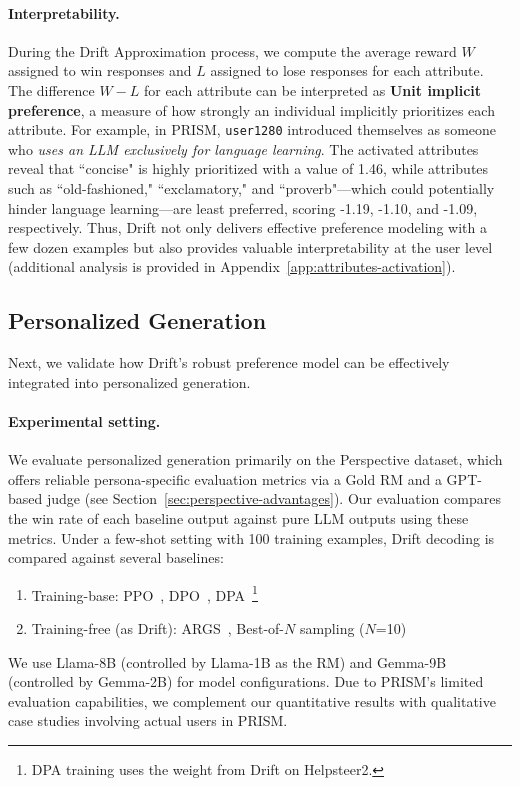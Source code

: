 \paragraph{Interpretability.}
During the Drift Approximation process, we compute the average reward $W$ assigned to win responses and $L$ assigned to lose responses for each attribute. The difference $W-L$ for each attribute can be interpreted as \textbf{Unit implicit preference}, a measure of how strongly an individual implicitly prioritizes each attribute. For example, in PRISM, \texttt{user1280} introduced themselves as someone who \textit{uses an LLM exclusively for language learning}. The activated attributes reveal that ``concise" is highly prioritized with a value of 1.46, while attributes such as ``old-fashioned," ``exclamatory," and ``proverb"—which could potentially hinder language learning—are least preferred, scoring -1.19, -1.10, and -1.09, respectively. Thus, Drift not only delivers effective preference modeling with a few dozen examples but also provides valuable interpretability at the user level (additional analysis is provided in Appendix~\ref{app:attributes-activation}).

\subsection{Personalized Generation}

Next, we validate how Drift's robust preference model can be effectively integrated into personalized generation.

\paragraph{Experimental setting.}
We evaluate personalized generation primarily on the Perspective dataset, which offers reliable persona-specific evaluation metrics via a Gold RM and a GPT-based judge (see Section~\ref{sec:perspective-advantages}). Our evaluation compares the win rate of each baseline output against pure LLM outputs using these metrics. Under a few-shot setting with 100 training examples, Drift decoding is compared against several baselines:
\begin{enumerate}
    \item Training-base: PPO~\citep{schulman2017proximal}, DPO~\citep{rafailov2024direct}, DPA~\footnote{DPA training uses the weight from Drift on Helpsteer2.}~\citep{DPA}
    \item Training-free (as Drift): ARGS~\citep{khanov2024args}, Best-of-$N$ sampling ($N$=10)
\end{enumerate}
We use Llama-8B (controlled by Llama-1B as the RM) and Gemma-9B (controlled by Gemma-2B) for model configurations. Due to PRISM’s limited evaluation capabilities, we complement our quantitative results with qualitative case studies involving actual users in PRISM.

